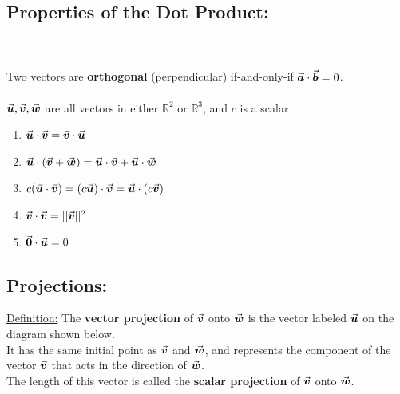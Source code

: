 \subsection*{Properties of the Dot Product:}
\vspace*{-.2in}

~\\~\\
Two vectors are \textbf{orthogonal} (perpendicular) if-and-only-if \(\a \cdot \b = 0\).\\~\\


\(\u, \v, \w\) are all vectors in either \(\mathbb{R}^2\) or \(\mathbb{R}^3\), and \(c\) is a scalar 
\begin{enumerate}
\item \(\u \cdot \v = \v \cdot \u\)
\item \(\u \cdot \left(\v +\w\right) = \u \cdot \v + \u \cdot \w\)
\item\( c(\u \cdot \v) = (c\u)\cdot \v  = \u \cdot (c\v)\)
\item \(\v \cdot \v = ||\v||^2\)
\item \(\vec{0} \cdot \u = 0\)
\end{enumerate}


\vspace*{.1in}

\subsection*{Projections:}
\underline{Definition:} The \textbf{vector projection} of \(\v\) onto \(\w\) is the vector labeled \(\u\) on the diagram shown below.\\
 It has the same initial point as \(\v\) and \(\w\), and represents the component of the vector \(\v\) that acts in the direction of \(\w\).\\
 The length of this vector is called the \textbf{scalar projection} of \(\v\) onto \(\w\).\\


